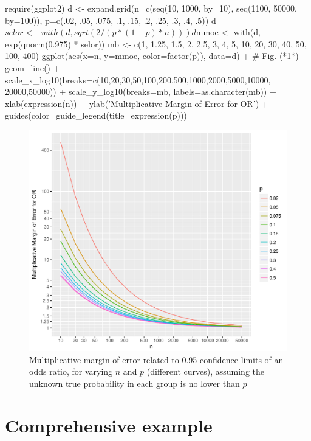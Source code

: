 \begin{Schunk}
\begin{Sinput}
require(ggplot2)
d <- expand.grid(n=c(seq(10, 1000, by=10), seq(1100, 50000, by=100)),
                 p=c(.02, .05, .075, .1, .15, .2, .25, .3, .4, .5))
d$selor <- with(d, sqrt(2 / (p * (1 - p) * n)))
d$mmoe  <- with(d, exp(qnorm(0.975) * selor))
mb <- c(1, 1.25, 1.5, 2, 2.5, 3, 4, 5, 10, 20, 30, 40, 50, 100, 400)
ggplot(aes(x=n, y=mmoe, color=factor(p)), data=d) +   # Fig. (*\ref{fig:prop-mmeor}*)
  geom_line() +
  scale_x_log10(breaks=c(10,20,30,50,100,200,500,1000,2000,5000,10000,
                  20000,50000)) +
  scale_y_log10(breaks=mb, labels=as.character(mb)) +
  xlab(expression(n)) + ylab('Multiplicative Margin of Error for OR') +
  guides(color=guide_legend(title=expression(p)))
\end{Sinput}
\begin{figure}[htbp]

\centerline{\includegraphics{prop-mmeor-1} }

\caption[Multiplicative margin of error for odds ratios]{Multiplicative margin of error related to 0.95 confidence limits of an odds ratio, for varying $n$ and $p$ (different curves), assuming the unknown true probability in each group is no lower than $p$}\label{fig:prop-mmeor}
\end{figure}
\end{Schunk}


\section{Comprehensive example}

